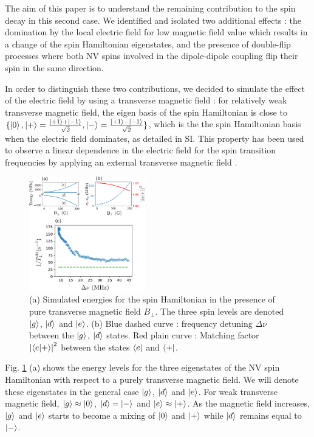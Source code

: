 \documentclass[preprintnumbers,amsmath,amssymb,superscriptaddress,twocolumn,showpacs]{revtex4-2}
\begin{document}
The aim of this paper is to understand the remaining contribution to the spin decay in this second case. We identified and isolated two additional effects : the domination by the local electric field for low magnetic field value which results in a change of the spin Hamiltonian eigenstates, and the presence of double-flip processes where both NV spins involved in the dipole-dipole coupling flip their spin in the same direction.

In order to distinguish these two contributions, we decided to simulate the effect of the electric field by using a transverse magnetic field : for relatively weak transverse magnetic field, the eigen basis of the spin Hamiltonian is close to $\{ \ket{0},\ket{+}=\frac{\ket{+1}+\ket{-1}}{\sqrt{2}},\ket{-}=\frac{\ket{+1}-\ket{-1}}{\sqrt{2}} \} $, which is the the spin Hamiltonian basis when the electric field dominates, as detailed in SI. This property has been used to observe a linear dependence in the electric field for the spin transition frequencies by applying an external transverse magnetic field \cite{dolde2011electric,qiu2022nanoscale}.

\begin{figure}
\includegraphics[width=0.45\textwidth]{Figures/fig transverse field V2}
\caption{(a) Simulated energies for the spin Hamiltonian in the presence of pure transverse magnetic field $B_\perp$. The three spin levels are denoted $\ket{g}$, $\ket{d}$ and $\ket{e}$. (b) Blue dashed curve : frequency detuning $\Delta \nu$ between the $\ket{g}$, $\ket{d}$ states. Red plain curve : Matching factor $\abs{\bra{e}\ket{+}}^2$ between the states $\bra{e}$ and $\bra{+}$.}
\label{B_transverse}
\end{figure}

Fig. \ref{B_transverse} (a) shows the energy levels for the three eigenstates of the NV spin Hamiltonian with respect to a purely transverse magnetic field. We will denote these eigenstates in the general case $\ket{g}$, $\ket{d}$ and $\ket{e}$. For weak transverse magnetic field, $\ket{g} \approx \ket{0}$, $\ket{d}=\ket{-}$ and $\ket{e} \approx \ket{+}$. As the magnetic field increases, $\ket{g}$ and $\ket{e}$ starts to become a mixing of $\ket{0}$ and $\ket{+}$ while $\ket{d}$ remains equal to $\ket{-}$.
\end{document}
